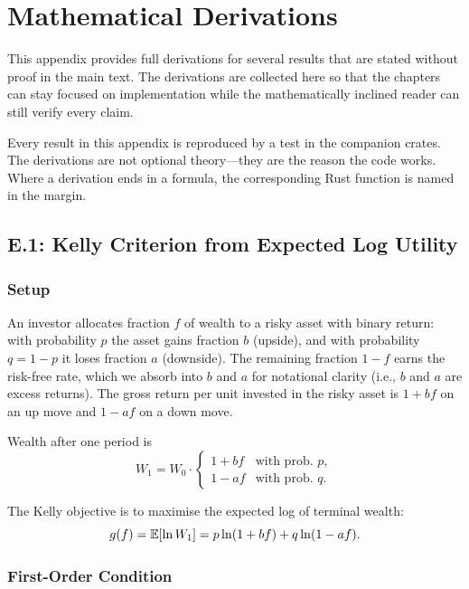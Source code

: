 \chapter{Mathematical Derivations}
\label{app:derivations}

This appendix provides full derivations for several results that are
stated without proof in the main text. The derivations are collected
here so that the chapters can stay focused on implementation while
the mathematically inclined reader can still verify every claim.

\begin{keyinsight}
Every result in this appendix is reproduced by a test in the
companion crates. The derivations are not optional theory---they are
the reason the code works. Where a derivation ends in a formula, the
corresponding Rust function is named in the margin.
\end{keyinsight}

\section{E.1: Kelly Criterion from Expected Log Utility}

\subsection{Setup}

An investor allocates fraction $f$ of wealth to a risky asset with
binary return: with probability $p$ the asset gains fraction $b$
(upside), and with probability $q = 1 - p$ it loses fraction $a$
(downside). The remaining fraction $1 - f$ earns the risk-free rate,
which we absorb into $b$ and $a$ for notational clarity (i.e., $b$
and $a$ are excess returns). The gross return per unit invested in
the risky asset is $1 + bf$ on an up move and $1 - af$ on a down move.

Wealth after one period is
\[
W_1 = W_0 \cdot \begin{cases} 1 + b f & \text{with prob.\ } p, \\ 1 - a f & \text{with prob.\ } q. \end{cases}
\]

The Kelly objective is to maximise the expected log of terminal
wealth:
\[
g(f) = \mathbb{E}[\ln W_1] = p \ln(1 + b f) + q \ln(1 - a f).
\]

\subsection{First-Order Condition}

